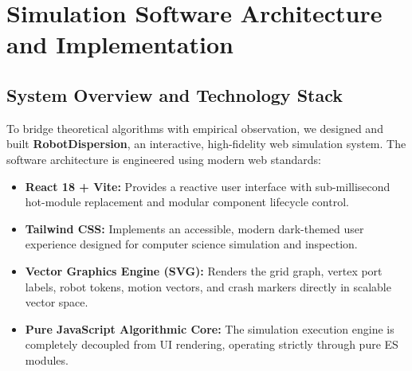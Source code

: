 \documentclass[11pt,a4paper]{report}
\begin{document}
\begin{table}[htbp]
\centering
\caption{Theoretical Complexity Bounds on an Unoriented Grid ($N = \sqrt{n} \times \sqrt{n}$)}
\label{tab:complexity_comparison}
\end{table}

\chapter{Simulation Software Architecture and Implementation}

\section{System Overview and Technology Stack}
To bridge theoretical algorithms with empirical observation, we designed and built \textbf{RobotDispersion}, an interactive, high-fidelity web simulation system. The software architecture is engineered using modern web standards:
\begin{itemize}
    \item \textbf{React 18 + Vite:} Provides a reactive user interface with sub-millisecond hot-module replacement and modular component lifecycle control.
    \item \textbf{Tailwind CSS:} Implements an accessible, modern dark-themed user experience designed for computer science simulation and inspection.
    \item \textbf{Vector Graphics Engine (SVG):} Renders the grid graph, vertex port labels, robot tokens, motion vectors, and crash markers directly in scalable vector space.
    \item \textbf{Pure JavaScript Algorithmic Core:} The simulation execution engine is completely decoupled from UI rendering, operating strictly through pure ES modules.
\end{itemize}
\end{document}
